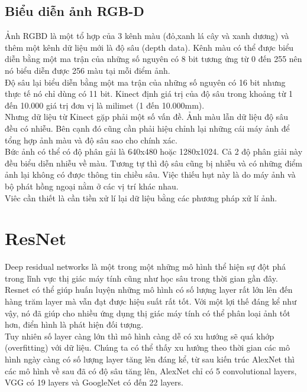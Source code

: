  

\subsection{Biểu diễn ảnh RGB-D}
Ảnh RGBD là một tổ hợp của 3 kênh màu (đỏ,xanh lá cây và xanh dương) và thêm một kênh dữ liệu mới là độ sâu (depth data). Kênh màu có thể được biểu diễn bằng một ma trận của những số nguyên có 8 bit tương ứng từ 0 đến 255 nên nó biểu diễn được 256 màu tại mỗi điểm ảnh.\\

Độ sâu lại biểu diễn bằng một ma trận của những số nguyên có 16 bit nhưng thực tế nó chỉ dùng có 11 bit.
Kinect định giá trị của độ sâu trong khoảng từ 1 đến 10.000 giá trị đơn vị là milimet (1 đến 10.000mm).\\

Nhưng dữ liệu từ Kinect gặp phải một số vấn đề. Ảnh màu lẫn dữ liệu độ sâu đều có nhiễu. Bên cạnh đó cũng cần phải hiệu chỉnh lại những cái máy ảnh để tổng hợp ảnh màu và độ sâu sao cho chính xác.\\

Bức ảnh có thể có độ phân gải là 640x480 hoặc 1280x1024. Cả 2 độ phân giải này đều biểu diễn nhiễu về màu. Tương tự thì độ sâu cũng bị nhiễu và có những điểm ảnh lại không có được thông tin chiều sâu. Việc thiếu hụt này là do máy ảnh và bộ phát hồng ngoại nằm ở các vị trí khác nhau.\\

Viêc cần thiết là cần tiền xử lí lại dữ liệu bằng các phương pháp xử lí ảnh.


\section{ResNet}

Deep residual networks là một trong một những mô hình thể hiện sự đột phá trong lĩnh vực thị giác máy tính cũng như học sâu trong thời gian gần đây. Resnet có thể giúp huấn luyện những mô hình có số lượng layer rất lớn lên đến hàng trăm layer mà vẫn đạt được hiệu suất rất tốt. Với một lợi thế đáng kể như vậy, nó đã giúp cho nhiều ứng dụng thị giác máy tính có thể phân loại ảnh tốt hơn, điển hình là phát hiện đối tượng.\\

Tuy nhiên số layer càng lớn thì  mô hình càng dễ có xu hướng sẽ quá khớp (overfitting) với dữ liệu. Chúng ta có thể thấy xu hướng theo thời gian các mô hình ngày càng có số lượng layer tăng lên đáng kể, từ sau kiến trúc AlexNet thì các mô hình về sau đã có độ sâu tăng lên, AlexNet chỉ có 5 convolutional layers, VGG có 19 layers và GoogleNet có đến 22 layers. \\

